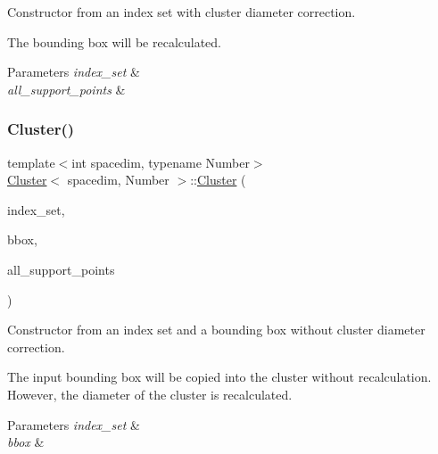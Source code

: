 Constructor from an index set with cluster diameter correction.

The bounding box will be recalculated. 
\begin{DoxyParams}{Parameters}
{\em index\+\_\+set} & \\
\hline
{\em all\+\_\+support\+\_\+points} & \\
\hline
\end{DoxyParams}
\mbox{\label{classCluster_aaa9ac4c5b6df1633980e45c3076e17e0}} 
\subsubsection{\texorpdfstring{Cluster()}{Cluster()}\hspace{0.1cm}{\footnotesize\ttfamily [5/7]}}
{\footnotesize\ttfamily template$<$int spacedim, typename Number$>$ \\
\hyperlink{classCluster}{Cluster}$<$ spacedim, Number $>$\+::\hyperlink{classCluster}{Cluster} (\begin{DoxyParamCaption}\item[{const std\+::vector$<$ types\+::global\+\_\+dof\+\_\+index $>$ \&}]{index\+\_\+set,  }\item[{const \hyperlink{classSimpleBoundingBox}{Simple\+Bounding\+Box}$<$ spacedim, Number $>$ \&}]{bbox,  }\item[{const std\+::vector$<$ Point$<$ spacedim, Number $>$$>$ \&}]{all\+\_\+support\+\_\+points }\end{DoxyParamCaption})}

Constructor from an index set and a bounding box without cluster diameter correction.

The input bounding box will be copied into the cluster without recalculation. However, the diameter of the cluster is recalculated. 
\begin{DoxyParams}{Parameters}
{\em index\+\_\+set} & \\
\hline
{\em bbox} & \\
\hline
\end{DoxyParams}
\mbox{\label{classCluster_adf806cf8bccb891707d8e7d4c345518b}} 
